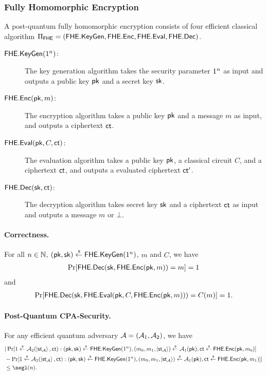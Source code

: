 
\subsubsection{Fully Homomorphic Encryption}
A post-quantum fully homomorphic encryption consists of four efficient classical algorithm $\Pi_{\mathsf{FHE}}=\allowbreak (\mathsf{FHE}.\mathsf{KeyGen},\mathsf{FHE}.\mathsf{Enc},\mathsf{FHE}.\mathsf{Eval},\mathsf{FHE}.\mathsf{Dec})$.
\begin{description}
\item[$\mathsf{FHE}.\mathsf{KeyGen}(1^n)$:] The key generation algorithm takes the security parameter $1^n$ as input and outputs a public key $\mathsf{pk}$ and a secret key $\mathsf{sk}$.
\item[$\mathsf{FHE}.\mathsf{Enc}(\mathsf{pk},m)$:] The encryption algorithm takes a public key $\mathsf{pk}$ and a message $m$ as input, and outputs a ciphertext $\mathsf{ct}$.
\item[$\mathsf{FHE}.\mathsf{Eval}(\mathsf{pk},C,\mathsf{ct})$:] The evaluation algorithm takes a public key $\mathsf{pk}$, a classical circuit $C$, and a ciphertext $\mathsf{ct}$, and outputs a evaluated ciphertext $\mathsf{ct}'$.
\item[$\mathsf{FHE}.\mathsf{Dec}(\mathsf{sk},\mathsf{ct})$:] The decryption algorithm takes secret key $\mathsf{sk}$ and a ciphertext $\mathsf{ct}$ as input and outputs a message $m$ or $\bot$. 
\end{description}
\paragraph{Correctness.}
For all $n\in \mathbb{N}$, $(\mathsf{pk},\mathsf{sk})\overset{\hspace{0.1em}\mathsf{\scriptscriptstyle\$}}{\leftarrow} \mathsf{FHE}.\mathsf{KeyGen}(1^n)$, $m$ and $C$, we have
\begin{align*}
    \Pr[\mathsf{FHE}.\mathsf{Dec}(\mathsf{sk},\mathsf{FHE}.\mathsf{Enc}(\mathsf{pk},m))=m]=1
\end{align*}
and
\begin{align*}
    \Pr[\mathsf{FHE}.\mathsf{Dec}(\mathsf{sk},\mathsf{FHE}.\mathsf{Eval}(\mathsf{pk},C,\mathsf{FHE}.\mathsf{Enc}(\mathsf{pk},m)))=C(m)]=1.
\end{align*}
\paragraph{Post-Quantum CPA-Security.}
For any efficient quantum adversary $\mathcal{A}=(\mathcal{A}_1,\mathcal{A}_2)$, we have  
\begin{align*}
    &|\Pr[1\sample  \A_2(\ket{\st_{\A}},\ct):(\pk,\sk)\sample \fhekeygen(1^\secpar),(m_0,m_1,\ket{\st_{\A}})\sample \A_1(\pk), \ct\sample \fheenc(\pk,m_0)]\\
    &-\Pr[1\sample  \A_2(\ket{\st_{\A}},\ct):(\pk,\sk)\sample \fhekeygen(1^\secpar),(m_0,m_1,\ket{\st_{\A}})\sample \A_1(\pk), \ct\sample \fheenc(\pk,m_1)]|\\
&\leq \negl(\secpar).
\end{align*}

